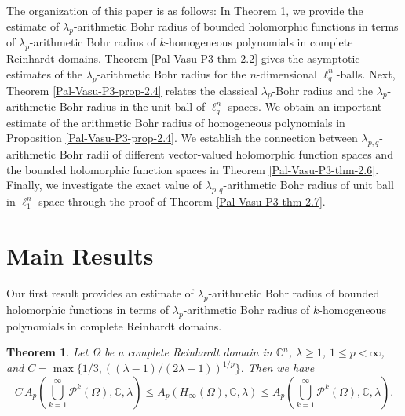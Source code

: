 \documentclass[a4paper,12pt]{amsart}
\newtheorem{thm}{Theorem}[section]
\theoremstyle{definition}
\begin{document}
The organization of this paper is as follows: In Theorem \ref{Pal-Vasu-P3-thm-1}, we provide the estimate of $\lambda_p$-arithmetic Bohr radius of bounded holomorphic functions in terms of $\lambda_p$-arithmetic Bohr radius of $k$-homogeneous polynomials in complete Reinhardt domains. Theorem \ref{Pal-Vasu-P3-thm-2.2} gives the asymptotic estimates of the $\lambda_p$-arithmetic Bohr radius for the $n$-dimensional $\ell^n_q$-balls. Next, Theorem \ref{Pal-Vasu-P3-prop-2.4} relates the classical $\lambda_{p}$-Bohr radius and the $\lambda_p$-arithmetic Bohr radius in the unit ball of $\ell^n_q$ spaces. We obtain an important estimate of the arithmetic Bohr radius of homogeneous polynomials in Proposition \ref{Pal-Vasu-P3-prop-2.4}. We establish the connection between $\lambda_{p,q}$-arithmetic Bohr radii of different vector-valued holomorphic function spaces and the bounded holomorphic function spaces in Theorem \ref{Pal-Vasu-P3-thm-2.6}. Finally, we investigate the exact value of $\lambda_{p,q}$-arithmetic Bohr radius of unit ball in $\ell^n_1$ space through the proof of Theorem \ref{Pal-Vasu-P3-thm-2.7}.


\section{Main Results}

Our first result provides an estimate of $\lambda_p$-arithmetic Bohr radius of bounded holomorphic functions in terms of $\lambda_p$-arithmetic Bohr radius of $k$-homogeneous polynomials in complete Reinhardt domains. 
\begin{thm}\label{Pal-Vasu-P3-thm-1}
	Let $\Omega$ be a complete Reinhardt domain in $\mathbb{C}^n$, $\lambda\geq 1$, $1\leq p <\infty$, and $C=\max \{1/3, ((\lambda-1)/(2\lambda-1))^{1/p}\}$. Then we have 
	\begin{equation*}
		C \,A_p\left(\bigcup_{k=1}^{\infty}\mathcal{P}^{k}(\Omega),\mathbb{C}, \lambda\right) \leq A_p\left(H_{\infty}(\Omega),\mathbb{C}, \lambda\right) \leq A_p\left(\bigcup_{k=1}^{\infty}\mathcal{P}^k(\Omega), \mathbb{C},\lambda\right).
	\end{equation*}  
\end{thm}
\end{document}
